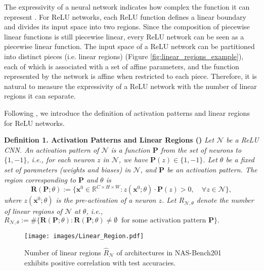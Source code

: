 \documentclass{article} \usepackage{iclr2021_conference,times}
\def\mP{{\bm{P}}}
\def\mR{{\bm{R}}}
\begin{document}
The expressivity of a neural network indicates how complex the function it can represent \citep{hornik1989multilayer,giryes2016deep}.
For ReLU networks, each ReLU function defines a linear boundary and divides its input space into two regions. Since the composition of piecewise linear functions is still piecewise linear, every ReLU network can be seen as a piecewise linear function. The input space of a ReLU network can be partitioned into distinct pieces (i.e. linear regions) (Figure \ref{fig:linear_regions_example}), each of which is associated with a set of affine parameters, and the function represented by the network is affine when restricted to each piece. Therefore, it is natural to measure the expressivity of a ReLU network with the number of linear regions it can separate.

Following \citet{raghu2017expressive,serra2018bounding,hanin2019complexity,hanin2019deep,xiong2020number}, we introduce the definition of activation patterns and linear regions for ReLU networks.

\textbf{Definition 1. Activation Patterns and Linear Regions (\citet{xiong2020number}) }\label{def:activation-regions}
\textit{
Let $\mathcal{N}$ be a ReLU CNN. 
An activation pattern of $\mathcal{N}$ is a function $\mP$ from the set of neurons to $\{1,-1\}$, i.e., for each neuron $z$ in $\mathcal{N}$, we have $\mP(z) \in \{1,-1\}$.   
Let $\theta$ be a fixed set of parameters (weights and biases) in $\mathcal{N}$, and $\mP$ be an activation pattern. The region corresponding to $\mP$ and $\theta$ is
\begin{equation}
\mR(\mP;\theta) := \{\bm{x}^0\in \mathbb{R}^{C\times H \times W}: z(\bm{x}^0;\theta)\cdot {\mP(z)} >0,\quad \forall z \in \mathcal{N}\},
\label{eq:linear_region}
\end{equation}
where $z(\bm{x}^0;\theta)$ is the pre-activation of a neuron $z$.
Let $R_{\mathcal{N},\theta}$ denote the number of linear regions of $\mathcal{N}$ at $\theta$, i.e., 
$
R_{\mathcal{N},\theta} := \#\{  \mR(\mP;\theta): \mR(\mP;\theta)\neq \emptyset ~ \text{ for some activation pattern } \mP    \}.
$
}
\begin{wrapfigure}{r}{55mm}
\vspace{-2em}
\texttt{[image: images/Linear\_Region.pdf]}
\centering
\vspace{-2em}
\caption{Number of linear regions $\hat{R}_\mathcal{N}$ of architectures in NAS-Bench201 exhibits positive correlation with test accuracies.}
\label{fig:linear_regions_201}
\vspace{-2em}
\end{wrapfigure}
\end{document}
